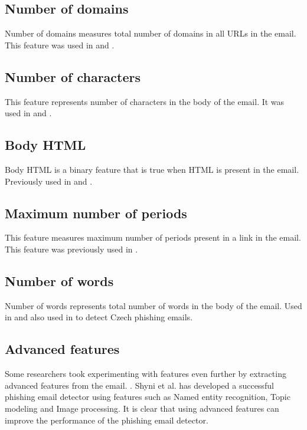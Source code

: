 \documentclass[thesis=B,english]{FITthesis}[2012/10/20]
\begin{document}
\subsection{Number of domains}
Number of domains measures total number of domains in all URLs in the email. This feature was used in \cite{fette2007learning} and \cite{vitListik2015detekce}.

\subsection{Number of characters}
This feature represents number of characters in the body of the email. It was used in \cite{features2006Chandrasekaran} and \cite{vitListik2015detekce}.

\subsection{Body HTML}
Body HTML is a binary feature that is true when HTML is present in the email. Previously used in \cite{fette2007learning} and \cite{vitListik2015detekce}.

\subsection{Maximum number of periods}
This feature measures maximum number of periods present in a link in the email. This feature was previously used in \cite{fette2007learning} \cite{featuresBergholz2008improved}.

\subsection{Number of words}
Number of words represents total number of words in the body of the email. Used in \cite{features2006Chandrasekaran} and also used in \cite{vitListik2015detekce} to detect Czech phishing emails.

\subsection{Advanced features}
Some researchers took experimenting with features even further by extracting advanced features from the email. \cite{indiaPaperMultiClassifier}. Shyni et al. \cite{indiaPaperMultiClassifier} has developed a successful phishing email detector using features such as Named entity recognition, Topic modeling and Image processing. It is clear that using advanced features can improve the performance of the phishing email detector.
\end{document}
